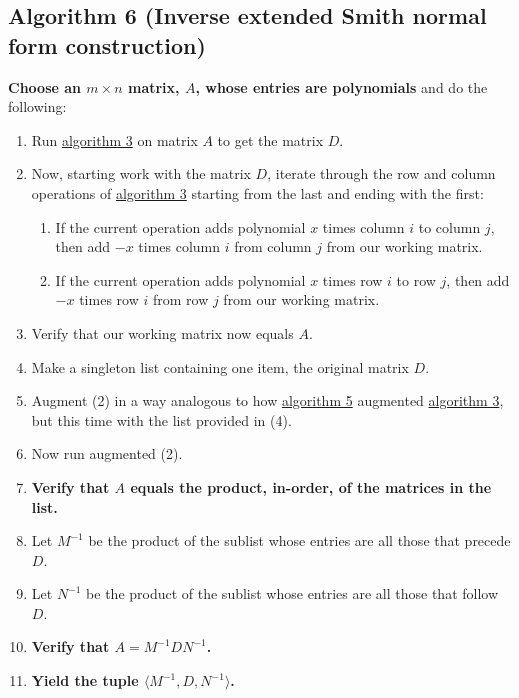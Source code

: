\documentclass[twocolumn]{article}
\begin{document}
		\subsection{Algorithm 6 (Inverse extended Smith normal form construction)}\label{sec:algorithm 6}
			\textbf{Choose an $m\times n$ matrix, $A$, whose entries are polynomials} and do the following:
			\begin{enumerate}
				\item Run \hyperref[sec:algorithm 3]{algorithm 3} on matrix $A$ to get the matrix $D$.
				\item Now, starting work with the matrix $D$, iterate through the row and column operations of \hyperref[sec:algorithm 3]{algorithm 3} starting from the last and ending with the first:
					\begin{enumerate}
						\item If the current operation adds polynomial $x$ times column $i$ to column $j$, then add $-x$ times column $i$ from column $j$ from our working matrix.
						\item If the current operation adds polynomial $x$ times row $i$ to row $j$, then add $-x$ times row $i$ from row $j$ from our working matrix.
					\end{enumerate}
				\item Verify that our working matrix now equals $A$.
				\item Make a singleton list containing one item, the original matrix $D$.
				\item Augment (2) in a way analogous to how \hyperref[sec:algorithm 5]{algorithm 5} augmented \hyperref[sec:algorithm 3]{algorithm 3}, but this time with the list provided in (4).
				\item Now run augmented (2).
				\item \textbf{Verify that $A$ equals the product, in-order, of the matrices in the list.}
				\item Let $M^{-1}$ be the product of the sublist whose entries are all those that precede $D$.
				\item Let $N^{-1}$ be the product of the sublist whose entries are all those that follow $D$.
				\item \textbf{Verify that $A=M^{-1}DN^{-1}$.}
				\item \textbf{Yield the tuple $\langle M^{-1}, D, N^{-1}\rangle$.}
			\end{enumerate}
\end{document}
